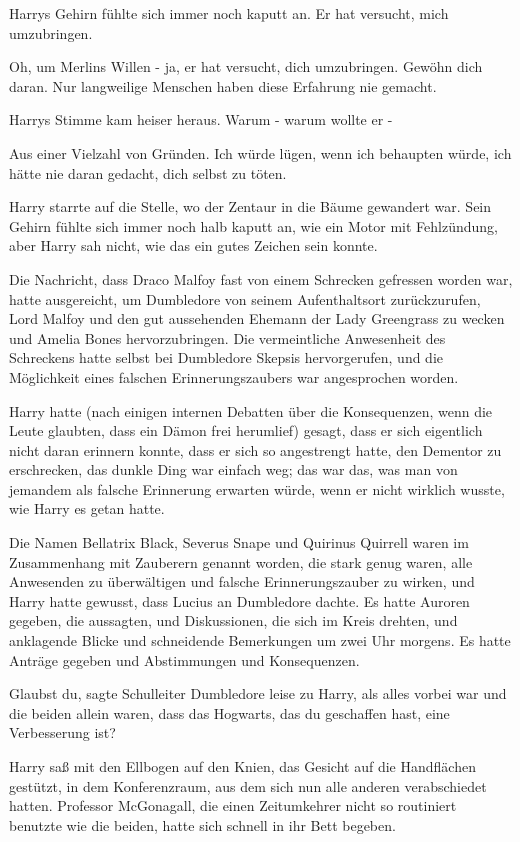 Harrys Gehirn fühlte sich immer noch kaputt an. \glqq{}Er hat versucht, mich
umzubringen.\grqq{}

\glqq{}Oh, um Merlins Willen - ja, er hat versucht, dich umzubringen. Gewöhn dich
daran. Nur langweilige Menschen haben diese Erfahrung nie gemacht.\grqq{}

Harrys Stimme kam heiser heraus. \glqq{}Warum - warum wollte er -\grqq{}

\glqq{}Aus einer Vielzahl von Gründen. Ich würde lügen, wenn ich behaupten würde,
ich hätte nie daran gedacht, dich selbst zu töten.\grqq{}

Harry starrte auf die Stelle, wo der Zentaur in die Bäume gewandert war. Sein
Gehirn fühlte sich immer noch halb kaputt an, wie ein Motor mit Fehlzündung,
aber Harry sah nicht, wie das ein gutes Zeichen sein konnte.

Die Nachricht, dass Draco Malfoy fast von einem Schrecken gefressen worden war,
hatte ausgereicht, um Dumbledore von seinem Aufenthaltsort zurückzurufen, Lord
Malfoy und den gut aussehenden Ehemann der Lady Greengrass zu wecken und Amelia
Bones hervorzubringen. Die vermeintliche Anwesenheit des Schreckens hatte selbst
bei Dumbledore Skepsis hervorgerufen, und die Möglichkeit eines falschen
Erinnerungszaubers war angesprochen worden.

Harry hatte (nach einigen internen Debatten über die Konsequenzen, wenn die
Leute glaubten, dass ein Dämon frei herumlief) gesagt, dass er sich eigentlich
nicht daran erinnern konnte, dass er sich so angestrengt hatte, den Dementor zu
erschrecken, das dunkle Ding war einfach weg; das war das, was man von jemandem
als falsche Erinnerung erwarten würde, wenn er nicht wirklich wusste, wie Harry
es getan hatte.

Die Namen Bellatrix Black, Severus Snape und Quirinus Quirrell waren im
Zusammenhang mit Zauberern genannt worden, die stark genug waren, alle
Anwesenden zu überwältigen und falsche Erinnerungszauber zu wirken, und Harry
hatte gewusst, dass Lucius an Dumbledore dachte. Es hatte Auroren gegeben, die
aussagten, und Diskussionen, die sich im Kreis drehten, und anklagende Blicke
und schneidende Bemerkungen um zwei Uhr morgens. Es hatte Anträge gegeben und
Abstimmungen und Konsequenzen.

\glqq{}Glaubst du\grqq{}, sagte Schulleiter Dumbledore leise zu Harry, als alles
vorbei war und die beiden allein waren, \glqq{}dass das Hogwarts, das du
geschaffen hast, eine Verbesserung ist?\grqq{}

Harry saß mit den Ellbogen auf den Knien, das Gesicht auf die Handflächen
gestützt, in dem Konferenzraum, aus dem sich nun alle anderen verabschiedet
hatten. Professor McGonagall, die einen Zeitumkehrer nicht so routiniert
benutzte wie die beiden, hatte sich schnell in ihr Bett begeben.

